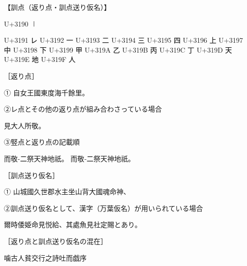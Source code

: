 \documentclass[paper=a5,tate]{jlreq}
\begin{document}
【訓点（返り点・訓点送り仮名）】

U+3190	㆐	%

U+3191	㆑	%
U+3192	㆒	%
U+3193	㆓	%
U+3194	㆔	%
U+3195	㆕	%
U+3196	㆖	%
U+3197	㆗	%
U+3198	㆘	%
U+3199	㆙	%
U+319A	㆚	%
U+319B	㆛	%
U+319C	㆜	%
U+319D	㆝	%
U+319E	㆞	%
U+319F	㆟	%

［返り点］

①
自女王國東度海千餘里。

②レ点とその他の返り点が組み合わさっている場合

見大人所敬。

③竪点と返り点の記載順

而敬\kaeriten-{㆓}祭天神地祇。
而敬\kaeriten‐{㆓}祭天神地祇。

［訓点送り仮名］

①
山城國久世郡水主坐山背大國魂命神、

②訓点送り仮名として、漢字（万葉仮名）が用いられている場合

爾時倭姫命見悦給、其處魚見社定賜とあり。

［返り点と訓点送り仮名の混在］

噛古人貧交行之詩吐而戯序
\end{document}
